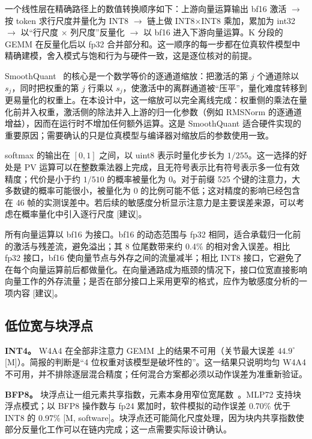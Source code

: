 \documentclass[a4paper,10.5pt]{ctexart}
\newcommand{\tM}{\textsf{[M]}}              %
\newcommand{\tMsw}{\textsf{[M, software]}}  %
\newcommand{\tR}{\textsf{[建议]}}           %
\begin{document}
一个线性层在精确路径上的数值转换顺序如下：上游向量运算输出 bf16 激活 $\to$ 按 token 求行尺度并量化为 INT8 $\to$ 链上做 INT8$\times$INT8 乘加，累加为 int32 $\to$ 以“行尺度 $\times$ 列尺度”反量化 $\to$ 以 bf16 进入下游向量运算。K 分段的 GEMM 在反量化后以 fp32 合并部分和。这一顺序的每一步都在位真软件模型中精确建模，舍入模式与饱和行为与硬件一致，这是逐位核对的前提。

SmoothQuant~\cite{smoothquant} 的核心是一个数学等价的逐通道缩放：把激活的第 $j$ 个通道除以 $s_j$，同时把权重的第 $j$ 行乘以 $s_j$，使激活中的离群通道被“压平”，量化难度转移到更易量化的权重上。在本设计中，这一缩放可以完全离线完成：权重侧的乘法在量化前并入权重，激活侧的除法并入上游的归一化参数（例如 RMSNorm 的逐通道增益），因而在运行时不增加任何额外运算。这是 SmoothQuant 适合硬件实现的重要原因；需要确认的只是位真模型与编译器对缩放后的参数使用一致。

softmax 的输出在 $[0,1]$ 之间，以 uint8 表示时量化步长为 $1/255$。这一选择的好处是 PV 运算可以在整数乘法器上完成，且无符号表示比有符号表示多一位有效精度；代价是小于约 $1/510$ 的概率被量化为 0。对于前缀 525 个键的注意力，大多数键的概率可能很小，被量化为 0 的比例可能不低；这对精度的影响已经包含在 46 帧的实测误差中。若后续的敏感度分析显示注意力是主要误差来源，可以考虑在概率量化中引入逐行尺度 \tR。

所有向量运算以 bf16 为接口。bf16 的动态范围与 fp32 相同，适合承载归一化前的激活与残差流，避免溢出；其 8 位尾数带来约 0.4\% 的相对舍入误差。相比 fp32 接口，bf16 使向量节点与外存之间的流量减半；相比 INT8 接口，它避免了在每个向量运算前后都做量化。在向量通路成为瓶颈的情况下，接口位宽直接影响向量工作的外存流量；是否在部分接口上采用更窄的格式，应作为敏感度分析的一项内容 \tR。

\subsection{低位宽与块浮点}

\textbf{INT4。} W4A4 在全部非注意力 GEMM 上的结果不可用（关节最大误差 $44.9^\circ$ \tM）。简报的判断是“4 位权重对该模型是破坏性的”。这一结果只说明均匀 W4A4 不可用，并不排除逐层混合精度；任何混合方案都必须以动作误差为准重新验证。

\textbf{BFP8。} 块浮点让一组元素共享指数，元素本身用窄位宽尾数~\cite{msfp,mx}。MLP72 支持块浮点模式；以 BFP8 操作数与 fp24 累加时，软件模拟的动作误差 0.70\% 优于 INT8 的 0.97\% \tMsw。块浮点还可能简化尺度处理，因为块内共享指数使部分反量化工作可以在链内完成；这一点需要实际设计确认。
\end{document}
